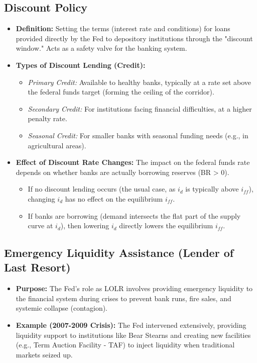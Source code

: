 \subsection{Discount Policy}
\begin{itemize}
    \item \textbf{Definition:} Setting the terms (interest rate and conditions) for loans provided directly by the Fed to depository institutions through the "discount window." Acts as a safety valve for the banking system.
    \item \textbf{Types of Discount Lending (Credit):}
        \begin{itemize}
            \item \textit{Primary Credit:} Available to healthy banks, typically at a rate set above the federal funds target (forming the ceiling of the corridor).
            \item \textit{Secondary Credit:} For institutions facing financial difficulties, at a higher penalty rate.
            \item \textit{Seasonal Credit:} For smaller banks with seasonal funding needs (e.g., in agricultural areas).
        \end{itemize}
    \item \textbf{Effect of Discount Rate Changes:} The impact on the federal funds rate depends on whether banks are actually borrowing reserves (BR > 0).
        \begin{itemize}
            \item If no discount lending occurs (the usual case, as $i_d$ is typically above $i_{ff}$), changing $i_d$ has no effect on the equilibrium $i_{ff}$.
            \item If banks are borrowing (demand intersects the flat part of the supply curve at $i_d$), then lowering $i_d$ directly lowers the equilibrium $i_{ff}$.
        \end{itemize}
\end{itemize}

\subsection{Emergency Liquidity Assistance (Lender of Last Resort)}
\begin{itemize}
    \item \textbf{Purpose:} The Fed's role as LOLR involves providing emergency liquidity to the financial system during crises to prevent bank runs, fire sales, and systemic collapse (contagion).
    \item \textbf{Example (2007-2009 Crisis):} The Fed intervened extensively, providing liquidity support to institutions like Bear Stearns and creating new facilities (e.g., Term Auction Facility - TAF) to inject liquidity when traditional markets seized up.
\end{itemize}

